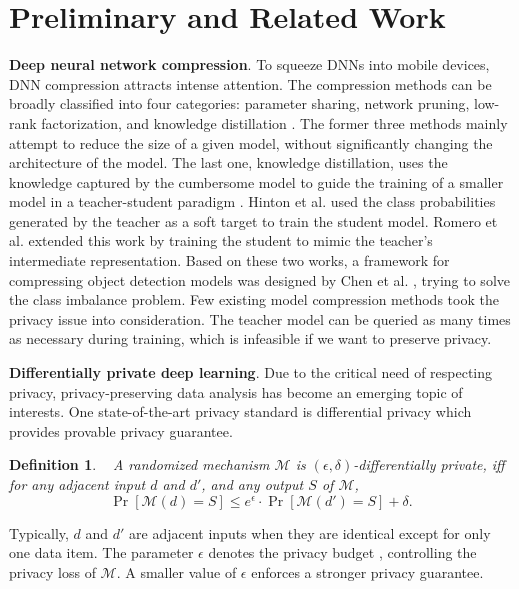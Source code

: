 \documentclass[letterpaper]{article} %
\newtheorem{definition}{Definition}
\begin{document}
\section{Preliminary and Related Work}
\textbf{Deep neural network compression}. To squeeze DNNs into mobile devices, DNN compression attracts intense attention. The compression methods can be broadly classified into four categories: parameter sharing, network pruning, low-rank factorization, and knowledge distillation \cite{han2015deep,howard2017mobile,cheng2018learning}. The former three methods mainly attempt to reduce the size of a given model, without significantly changing the architecture of the model. The last one, knowledge distillation, uses the knowledge captured by the cumbersome model to guide the training of a smaller model in a teacher-student paradigm \cite{bucila2006model}. Hinton et al. \cite{hinton2015distilling} used the class probabilities generated by the teacher as a soft target to train the student model. Romero et al. \cite{romero2015fitnets} extended this work by training the student to mimic the teacher's intermediate representation. Based on these two works, a framework for compressing object detection models was designed by Chen et al. \cite{cheng2018learning}, trying to solve the class imbalance problem. Few existing model compression methods took the privacy issue into consideration. The teacher model can be queried as many times as necessary during training, which is infeasible if we want to preserve privacy.

\textbf{Differentially private deep learning}. Due to the critical need of respecting privacy, privacy-preserving data analysis has become an emerging topic of interests. One state-of-the-art privacy standard is differential privacy \cite{dwork2011diff} which provides provable privacy guarantee.

\begin{definition}~\cite{dwork2011diff}
  A randomized mechanism $\mathcal{M}$ is $(\epsilon,\delta)$-differentially private, iff for any adjacent input $d$ and $d'$, and any output $S$ of $\mathcal{M}$,
  \begin{equation}
    \Pr [\mathcal{M} (d) = S] \le {e^\epsilon } \cdot \Pr [\mathcal{M} (d') = S]+\delta.
  \end{equation}
\end{definition}

Typically, $d$ and $d'$ are adjacent inputs when they are identical except for only one data item. The parameter $\epsilon$ denotes the privacy budget \cite{dwork2011diff}, controlling the privacy loss of $\mathcal{M}$. A smaller value of $\epsilon$ enforces a stronger privacy guarantee.
\end{document}
